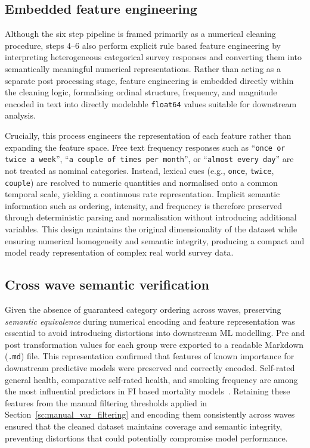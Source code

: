 \subsection{Embedded feature engineering}\label{subsec:feature_engineering}
Although the six step pipeline is framed primarily as a numerical cleaning procedure, steps 4--6 also perform explicit rule based feature engineering by interpreting heterogeneous categorical survey responses and converting them into semantically meaningful numerical representations. Rather than acting as a separate post processing stage, feature engineering is embedded directly within the cleaning logic, formalising ordinal structure, frequency, and magnitude encoded in text into directly modelable \texttt{float64} values suitable for downstream analysis.

Crucially, this process engineers the representation of each feature rather than expanding the feature space. Free text frequency responses such as ``\texttt{once or twice a week}'', ``\texttt{a couple of times per month}'', or ``\texttt{almost every day}'' are not treated as nominal categories. Instead, lexical cues (e.g., \texttt{once}, \texttt{twice}, \texttt{couple}) are resolved to numeric quantities and normalised onto a common temporal scale, yielding a continuous rate representation. Implicit semantic information such as ordering, intensity, and frequency is therefore preserved through deterministic parsing and normalisation without introducing additional variables. This design maintains the original dimensionality of the dataset while ensuring numerical homogeneity and semantic integrity, producing a compact and model ready representation of complex real world survey data.

\subsection{Cross wave semantic verification}
Given the absence of guaranteed category ordering across waves, preserving \emph{semantic equivalence} during numerical encoding and feature representation was essential to avoid introducing distortions into downstream \gls{ML} modelling. Pre and post transformation values for each group were exported to a readable Markdown (\texttt{.md}) file. This representation confirmed that features of known importance for downstream predictive models were preserved and correctly encoded. Self-rated general health, comparative self-rated health, and smoking frequency are among the most influential predictors in \gls{FI} based mortality models~\cite{moguilnerImportanceAgePrediction2021}. Retaining these features from the manual filtering thresholds applied in Section~\ref{sc:manual_var_filtering} and encoding them consistently across waves ensured that the cleaned dataset maintains coverage and semantic integrity, preventing distortions that could potentially compromise model performance.

